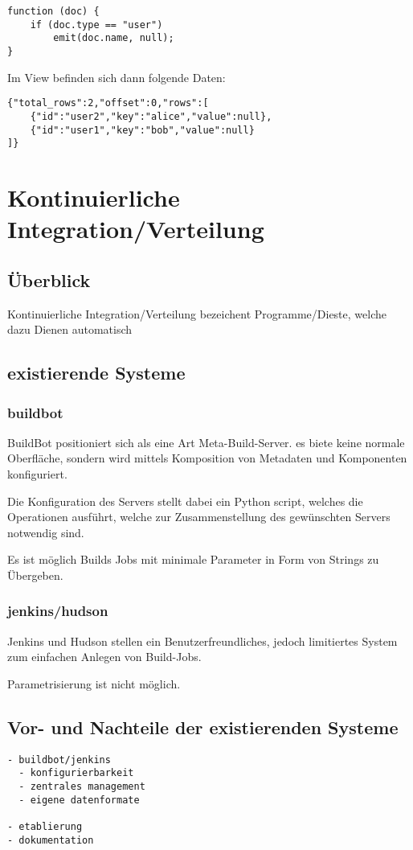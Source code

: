 \begin{verbatim}
function (doc) {
    if (doc.type == "user")
        emit(doc.name, null);
}
\end{verbatim}

Im View befinden sich dann folgende Daten:

\begin{verbatim}
{"total_rows":2,"offset":0,"rows":[
    {"id":"user2","key":"alice","value":null},
    {"id":"user1","key":"bob","value":null}
]}
\end{verbatim}



\section{Kontinuierliche Integration/Verteilung}

\subsection{Überblick}

Kontinuierliche Integration/Verteilung bezeichent Programme/Dieste,
welche dazu Dienen automatisch 

\subsection{existierende Systeme}

\subsubsection{buildbot}

BuildBot positioniert sich als eine Art Meta-Build-Server.
es biete keine normale Oberfläche, sondern wird mittels
Komposition von Metadaten und Komponenten konfiguriert.

Die Konfiguration des Servers stellt dabei ein Python script,
welches die Operationen ausführt, welche zur Zusammenstellung des gewünschten Servers notwendig sind.

Es ist möglich Builds Jobs mit minimale Parameter in Form von Strings zu Übergeben.

\subsubsection{jenkins/hudson}

Jenkins und Hudson stellen ein Benutzerfreundliches,
jedoch limitiertes System zum einfachen Anlegen von Build-Jobs.

Parametrisierung ist nicht möglich.

\subsection{Vor- und Nachteile der existierenden Systeme}

\begin{verbatim}
- buildbot/jenkins
  - konfigurierbarkeit
  - zentrales management
  - eigene datenformate

- etablierung
- dokumentation
\end{verbatim}
